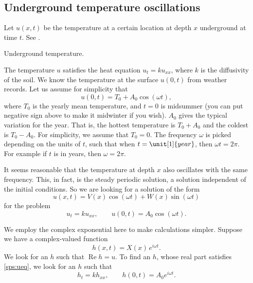 \subsection{Underground temperature oscillations}

Let $u(x,t)$ be the temperature at a certain location at depth $x$
underground at time $t$.  See .

\begin{mywrapfig}{2.65in}
\capstart
{}
\caption{Underground temperature.\label{sps:groundtempfig}}
\end{mywrapfig}

The temperature $u$ satisfies the heat equation $u_t = ku_{xx}$, where $k$
is the diffusivity of the soil.
We know the temperature at the surface $u(0,t)$ from weather
records.  Let us assume for simplicity that
\begin{equation*}
u(0,t) = T_0 + A_0 \cos (\omega t) ,
\end{equation*}
where $T_0$ is the yearly mean
temperature, and
$t=0$ is midsummer (you can put
negative sign above to make it midwinter if you wish).  $A_0$ gives 
the typical variation for the year.  That is,
the hottest temperature is $T_0 + A_0$ and the coldest is $T_0 - A_0$.
For simplicity, we assume that $T_0 = 0$.
The frequency $\omega$ is picked depending on the units of $t$, such that
when $t=\unit[1]{year}$, then $\omega t = 2 \pi$.  For example if $t$ is
in years, then $\omega = 2\pi$.

It seems reasonable that the temperature at depth $x$ also oscillates
with the same frequency.  This, in fact, is the steady periodic
solution, a solution independent of the initial conditions.
So we are looking for a solution of the form
\begin{equation*}
u(x,t) = V(x) \cos (\omega t) + W (x) \sin ( \omega t)
\end{equation*}
for the problem
\begin{equation} \label{sps:ueq}
u_t = k u_{xx}, \qquad u(0,t) = A_0 \cos ( \omega t) .
\end{equation}

We employ the complex exponential here to make calculations simpler.
Suppose we have a complex-valued function
\begin{equation*}
h(x,t) = X(x)\, e^{i\omega t} .
\end{equation*}
We look for an $h$ such that $\operatorname{Re} h = u$.
To find an $h$, whose real part satisfies \eqref{sps:ueq}, we look for
an $h$ such that
\begin{equation} \label{sps:heq}
h_t = k h_{xx}, \qquad h(0,t) = A_0 e^{i\omega t} .
\end{equation}

